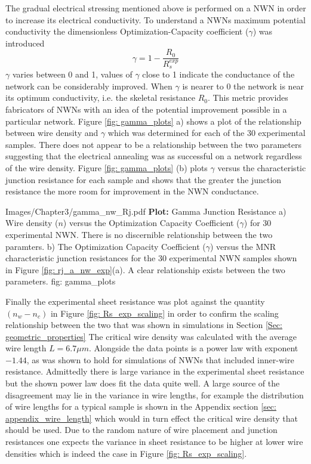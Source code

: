 The gradual electrical stressing mentioned above is performed on a NWN in order to increase its electrical conductivity. To understand a NWNs maximum potential conductivity the dimensionless Optimization-Capacity coefficient ($\gamma$) was introduced  
\begin{equation}
\gamma = 1 - \frac{R_0}{R_s^{exp}}
\end{equation}
$\gamma$ varies between 0 and 1, values of $\gamma$ close to 1 indicate the conductance of the network can be considerably improved. When $\gamma$ is nearer to 0 the network is near its optimum conductivity, i.e. the skeletal resistance $R_0$. This metric provides fabricators of NWNs with an idea of the potential improvement possible in a particular network. Figure \ref{fig: gamma_plots} a) shows a plot of the relationship between wire density and $\gamma$ which was determined for each of the 30 experimental samples. There does not appear to be a relationship between the two parameters suggesting that the electrical annealing was as successful on a network regardless of the wire density. Figure \ref{fig: gamma_plots} (b) plots $\gamma$ versus the characteristic junction resistance for each sample and shows that the greater the junction resistance the more room for improvement in the NWN conductance. 

{Images/Chapter3/gamma_nw_Rj.pdf}
{\textbf{Plot:} Gamma Junction Resistance}
{a) Wire density ($n$) versus the Optimization Capacity Coefficient ($\gamma$) for 30 experimental NWN. There is no discernible relationship between the two paramters. b) The Optimization Capacity Coefficient ($\gamma$) versus the MNR characteristic junction resistances for the 30 experimental NWN samples shown in Figure \ref{fig: rj_a_nw_exp}(a). A clear relationship exists between the two parameters.}
{fig: gamma_plots}

Finally the experimental sheet resistance was plot against the quantity $(n_w-n_c)$ in Figure \ref{fig: Rs_exp_scaling} in order to confirm the scaling relationship between the two that was shown in simulations in Section \ref{Sec: geometric_properties} The critical wire density was calculated with the average wire length $L=6.7\mu m$. Alongside the data points is a power law with exponent $-1.44$, as was shown to hold for simulations of NWNs that included inner-wire resistance. Admittedly there is large variance in the experimental sheet resistance but the shown power law does fit the data quite well. A large source of the disagreement may lie in the variance in wire lengths, for example the distribution of wire lengths for a typical sample is shown in the Appendix section \ref{sec: appendix_wire_length} which would in turn effect the critical wire density that should be used. Due to the random nature of wire placement and junction resistances one expects the variance in sheet resistance to be higher at lower wire densities which is indeed the case in Figure \ref{fig: Rs_exp_scaling}.

